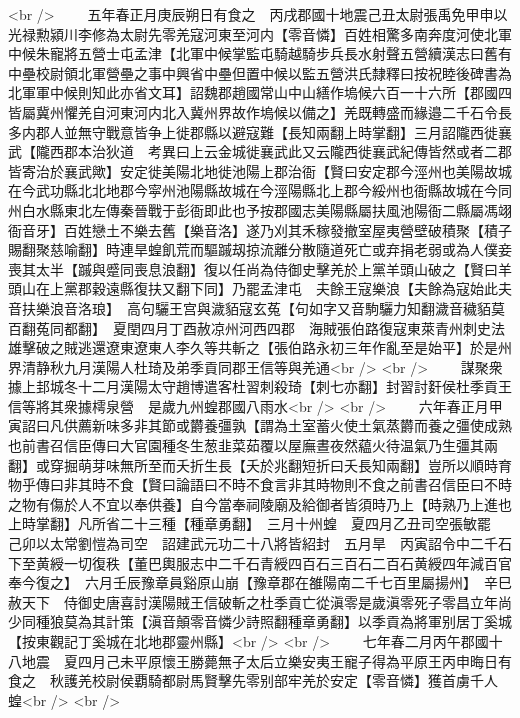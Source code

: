 <br />
　　五年春正月庚辰朔日有食之　丙戌郡國十地震己丑太尉張禹免甲申以光禄勲潁川李修為太尉先零羌寇河東至河内【零音憐】百姓相驚多南奔度河使北軍中候朱寵將五營士屯孟津【北軍中候掌監屯騎越騎步兵長水射聲五營續漢志曰舊有中壘校尉領北軍營壘之事中興省中壘但置中候以監五營洪氏隸釋曰按祝睦後碑書為北軍軍中候則知此亦省文耳】詔魏郡趙國常山中山繕作塢候六百一十六所【郡國四皆屬冀州懼羌自河東河内北入冀州界故作塢候以備之】羌既轉盛而緣邉二千石令長多内郡人並無守戰意皆争上徙郡縣以避寇難【長知兩翻上時掌翻】三月詔隴西徙襄武【隴西郡本治狄道　考異曰上云金城徙襄武此又云隴西徙襄武紀傳皆然或者二郡皆寄治於襄武歟】安定徙美陽北地徙池陽上郡治衙【賢曰安定郡今涇州也美陽故城在今武功縣北北地郡今寜州池陽縣故城在今涇陽縣北上郡今綏州也衙縣故城在今同州白水縣東北左傳秦晉戰于彭衙即此也予按郡國志美陽縣屬扶風池陽衙二縣屬馮翊衙音牙】百姓戀土不樂去舊【樂音洛】遂乃刈其禾稼發撤室屋夷營壁破積聚【積子賜翻聚慈喻翻】時連旱蝗飢荒而驅䠞刼掠流離分散隨道死亡或弃捐老弱或為人僕妾喪其太半【䠞與蹙同喪息浪翻】復以任尚為侍御史擊羌於上黨羊頭山破之【賢曰羊頭山在上黨郡穀遠縣復扶又翻下同】乃罷孟津屯　夫餘王寇樂浪【夫餘為寇始此夫音扶樂浪音洛琅】　高句驪王宫與濊貊寇玄菟【句如字又音駒驪力知翻濊音穢貊莫百翻菟同都翻】　夏閏四月丁酉赦凉州河西四郡　海賊張伯路復寇東萊青州刺史法雄擊破之賊逃還遼東遼東人李久等共斬之【張伯路永初三年作亂至是始平】於是州界清静秋九月漢陽人杜琦及弟季貢同郡王信等與羌通<br />
<br />
　　謀聚衆據上邽城冬十二月漢陽太守趙博遣客杜習刺殺琦【刺七亦翻】封習討姧侯杜季貢王信等將其衆據樗泉營　是歲九州蝗郡國八雨水<br />
<br />
　　六年春正月甲寅詔曰凡供薦新味多非其節或欝養彊孰【謂為土室蓄火使土氣蒸欝而養之彊使成熟也前書召信臣傳曰大官園種冬生葱韭菜茹覆以屋廡晝夜然藴火待温氣乃生彊其兩翻】或穿掘萌芽味無所至而夭折生長【夭於兆翻短折曰夭長知兩翻】豈所以順時育物乎傳曰非其時不食【賢曰論語曰不時不食言非其時物則不食之前書召信臣曰不時之物有傷於人不宜以奉供養】自今當奉祠陵廟及給御者皆須時乃上【時熟乃上進也上時掌翻】凡所省二十三種【種章勇翻】　三月十州蝗　夏四月乙丑司空張敏罷　己卯以太常劉愷為司空　詔建武元功二十八將皆紹封　五月旱　丙寅詔令中二千石下至黄綬一切復秩【董巴輿服志中二千石青綬四百石三百石二百石黄綬四年減百官奉今復之】　六月壬辰豫章員谿原山崩【豫章郡在雒陽南二千七百里屬揚州】　辛巳赦天下　侍御史唐喜討漢陽賊王信破斬之杜季貢亡從滇零是歲滇零死子零昌立年尚少同種狼莫為其計策【滇音顛零音憐少詩照翻種章勇翻】以季貢為將軍别居丁奚城【按東觀記丁奚城在北地郡靈州縣】<br />
<br />
　　七年春二月丙午郡國十八地震　夏四月己未平原懷王勝薨無子太后立樂安夷王寵子得為平原王丙申晦日有食之　秋護羌校尉侯覇騎都尉馬賢擊先零别部牢羌於安定【零音憐】獲首虜千人　蝗<br />
<br />
